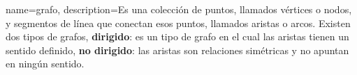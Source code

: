 

{
	name=grafo,
	description={Es una colección de puntos, llamados vértices o nodos, y segmentos de línea que conectan esos puntos, llamados aristas o arcos. Existen dos tipos de grafos, \textbf{dirigido}: es un tipo de grafo en el cual las aristas tienen un sentido definido, \textbf{no dirigido}: las aristas son relaciones simétricas y no apuntan en ningún sentido.}
}